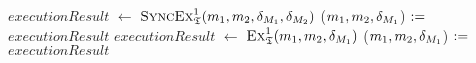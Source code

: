 \begin{algorithmic}[1]
            \State {}
        \EndIf
         \label{algo:synchronization:executesynchronizingbidirectionaltransformation:line:synchronizationstart}
            \State $executionResult$ $\leftarrow$ $\textsc{SyncEx}_{\mathfrak{T}}^1(m_{1}, m_{2}, \delta_{M_{1}}, \delta_{M_{2}})$
                \State \Return{$\bot$} \label{algo:synchronization:executesynchronizingbidirectionaltransformation:line:returnbot1}
            \Else
                \State ($m_{1}, 
                m_{2}, \delta_{M_{1}}$) $:=$ $executionResult$
            \EndIf
        \EndIf \label{algo:synchronization:executesynchronizingbidirectionaltransformation:line:synchronizationend}
            \State $executionResult$ $\leftarrow$ $\textsc{Ex}_{\mathfrak{T}}^1(m_{1}, m_{2}, \delta_{M_{1}})$
                \State \Return{$\bot$} \label{algo:executesynchronizingbidirectionaltransformation:line:returnbot2}
            \Else
                \State ($m_{1}, m_{2}, \delta_{M_{1}}$) $:=$ $executionResult$
            \EndIf
        \EndWhile
        \State {} \label{algo:synchronization:executesynchronizingbidirectionaltransformation:line:returnresult}
    \EndProcedure
\end{algorithmic}